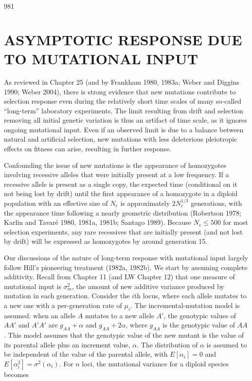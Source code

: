 \documentclass{article}
\begin{document}
{981

\section{ASYMPTOTIC RESPONSE DUE TO MUTATIONAL INPUT}
As reviewed in Chapter 25 (and by Frankham 1980, 1983a; Weber and Diggins 1990; Weber 2004), there is strong evidence that new mutations contribute to selection response even during the relatively short time scales of many so-called “long-term” laboratory experiments. The limit resulting from drift and selection removing all initial genetic variation is thus an artifact of time scale, as it ignores ongoing mutational input. Even if an observed limit is due to a balance between natural and artificial selection, new mutations with less deleterious pleiotropic effects on fitness can arise, resulting in further response.

Confounding the issue of new mutations is the appearance of homozygotes involving recessive alleles that were initially present at a low frequency. If a recessive allele is present as a single copy, the expected time (conditional on it not being lost by drift) until the first appearance of a homozygote in a diploid population with an effective size of  $ N_e $ is approximately  $ 2N_e^{1/3} $ generations, with the appearance time following a nearly geometric distribution (Robertson 1978; Karlin and Tavaré 1980, 1981a, 1981b; Santago 1989). Because  $ N_e \leq 500 $ for most selection experiments, any rare recessives that are initially present (and not lost by drift) will be expressed as homozygotes by around generation 15.

Our discussions of the nature of long-term response with mutational input largely follow Hill's pioneering treatment (1982a, 1982b). We start by assuming complete additivity. Recall from Chapter 11 (and LW Chapter 12) that one measure of mutational input is  $ \sigma_m^2 $, the amount of new additive variance produced by mutation in each generation. Consider the  $ i $th locus, where each allele mutates to a new one with a per-generation rate of  $ \mu_i $. The incremental-mutation model is assumed: when an allele  $ A $ mutates to a new allele  $ A' $, the genotypic values of  $ AA' $ and  $ A'A' $ are  $ g_{AA} + \alpha $ and  $ g_{AA} + 2\alpha $, where  $ g_{AA} $ is the genotypic value of  $ AA $. This model assumes that the genotypic value of the new mutant is the value of its parental allele plus an increment value,  $ \alpha $. The distribution of  $ \alpha $ is assumed to be independent of the value of the parental allele, with  $ E[\alpha_i] = 0 $ and  $ E[\alpha_i^2] = \sigma^2(\alpha_i) $. For  $ n $ loci, the mutational variance for a diploid species becomes

}
\end{document}
